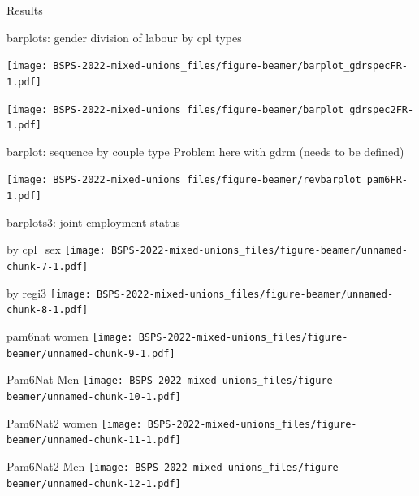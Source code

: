 \documentclass[
  ignorenonframetext,
]{beamer}
\begin{document}
\begin{frame}{Results}
\protect\hypertarget{results}{}
\begin{block}{barplots: gender division of labour by cpl types}
\protect\hypertarget{barplots-gender-division-of-labour-by-cpl-types}{}
\end{block}

\begin{block}{}
\protect\hypertarget{section}{}
\texttt{[image: BSPS-2022-mixed-unions\_files/figure-beamer/barplot\_gdrspecFR-1.pdf]}
\end{block}

\begin{block}{}
\protect\hypertarget{section-1}{}
\texttt{[image: BSPS-2022-mixed-unions\_files/figure-beamer/barplot\_gdrspec2FR-1.pdf]}
\end{block}

\begin{block}{barplot: sequence by couple type}
\protect\hypertarget{barplot-sequence-by-couple-type}{}
Problem here with gdrm (needs to be defined)

\texttt{[image: BSPS-2022-mixed-unions\_files/figure-beamer/revbarplot\_pam6FR-1.pdf]}
\end{block}

\begin{block}{barplots3: joint employment status}
\protect\hypertarget{barplots3-joint-employment-status}{}
\end{block}

\begin{block}{by cpl\_sex}
\protect\hypertarget{by-cpl_sex}{}
\texttt{[image: BSPS-2022-mixed-unions\_files/figure-beamer/unnamed-chunk-7-1.pdf]}
\end{block}

\begin{block}{by regi3}
\protect\hypertarget{by-regi3}{}
\texttt{[image: BSPS-2022-mixed-unions\_files/figure-beamer/unnamed-chunk-8-1.pdf]}
\end{block}

\begin{block}{pam6nat women}
\protect\hypertarget{pam6nat-women}{}
\texttt{[image: BSPS-2022-mixed-unions\_files/figure-beamer/unnamed-chunk-9-1.pdf]}
\end{block}

\begin{block}{Pam6Nat Men}
\protect\hypertarget{pam6nat-men}{}
\texttt{[image: BSPS-2022-mixed-unions\_files/figure-beamer/unnamed-chunk-10-1.pdf]}
\end{block}

\begin{block}{Pam6Nat2 women}
\protect\hypertarget{pam6nat2-women}{}
\texttt{[image: BSPS-2022-mixed-unions\_files/figure-beamer/unnamed-chunk-11-1.pdf]}
\end{block}

\begin{block}{Pam6Nat2 Men}
\protect\hypertarget{pam6nat2-men}{}
\texttt{[image: BSPS-2022-mixed-unions\_files/figure-beamer/unnamed-chunk-12-1.pdf]}
\end{block}
\end{frame}
\end{document}
